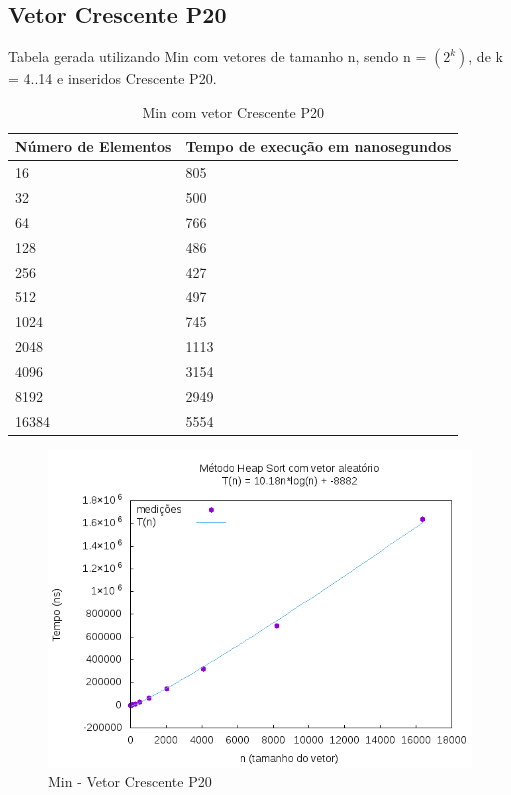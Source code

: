 \documentclass[12pt,a4paper,twoside]{report}
\begin{document}
\subsection{Vetor Crescente P20}
Tabela gerada utilizando Min com vetores de tamanho n, sendo n = $(2^k)$, de k = 4..14 e inseridos Crescente P20.
\begin{table}[H]
\centering
\caption{Min com vetor Crescente P20}
\label{my-label}
\begin{tabular}{|l|l|}
\hline
\multicolumn{1}{|c|}{\textbf{Número de Elementos}} & \multicolumn{1}{c|}{\textbf{Tempo de execução em nanosegundos}} \\ \hline
16 & 805 \\ \hline
32 & 500 \\ \hline
64 & 766 \\ \hline
128 & 486 \\ \hline
256 & 427 \\ \hline
512 & 497 \\ \hline
1024 & 745 \\ \hline
2048 & 1113 \\ \hline
4096 & 3154 \\ \hline
8192 & 2949 \\ \hline
16384 & 5554 \\ \hline
\end{tabular}
\end{table}

\begin{figure}[H]
    \centering
    \includegraphics[width=0.7\linewidth]{graficos/HeapSort/vIntAleatorio/vIntAleatorio.png}
  \caption{Min - Vetor Crescente P20}
\end{figure}
\end{document}

